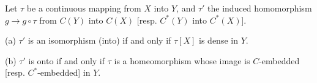 Let $\tau$ be a continuous mapping from $X$ into $Y$,
and $\tau'$ the induced homomorphism $g \rightarrow g \circ \tau$
from $C(Y)$ into $C(X)$ [resp. $C^*(Y)$ into $C^*(X)$].

(a) $\tau'$ is an isomorphism (into) if and only if $\tau[X]$ is dense in $Y$.

(b) $\tau'$ is onto if and only if $\tau$ is a homeomorphism whose image
is $C$-embedded [resp. $C^*$-embedded] in $Y$.

